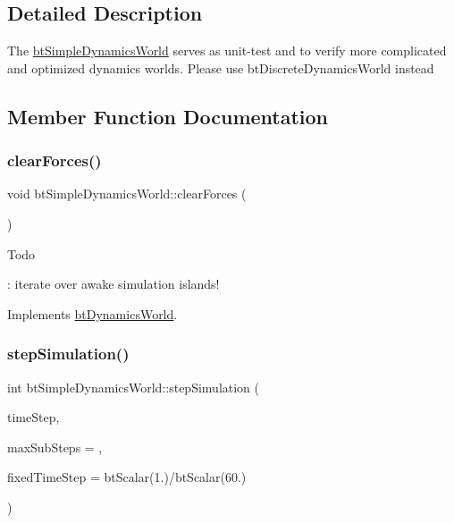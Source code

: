 \subsection{Detailed Description}
The \hyperlink{classbtSimpleDynamicsWorld}{bt\+Simple\+Dynamics\+World} serves as unit-\/test and to verify more complicated and optimized dynamics worlds. Please use bt\+Discrete\+Dynamics\+World instead 

\subsection{Member Function Documentation}
\mbox{\label{classbtSimpleDynamicsWorld_ac44c80444f4d6d4e3c2955dd43b7a93a}} 
\subsubsection{\texorpdfstring{clear\+Forces()}{clearForces()}}
{\footnotesize\ttfamily void bt\+Simple\+Dynamics\+World\+::clear\+Forces (\begin{DoxyParamCaption}{ }\end{DoxyParamCaption})\hspace{0.3cm}{\ttfamily [virtual]}}

\begin{DoxyRefDesc}{Todo}
\item[\hyperlink{todo__todo000033}{Todo}]\+: iterate over awake simulation islands! \end{DoxyRefDesc}


Implements \hyperlink{classbtDynamicsWorld}{bt\+Dynamics\+World}.

\mbox{\label{classbtSimpleDynamicsWorld_af6b4810b5018cbaf09f82839111a243d}} 
\subsubsection{\texorpdfstring{step\+Simulation()}{stepSimulation()}}
{\footnotesize\ttfamily int bt\+Simple\+Dynamics\+World\+::step\+Simulation (\begin{DoxyParamCaption}\item[{bt\+Scalar}]{time\+Step,  }\item[{int}]{max\+Sub\+Steps = {},  }\item[{bt\+Scalar}]{fixed\+Time\+Step = {\ttfamily btScalar(1.)/btScalar(60.)} }\end{DoxyParamCaption})\hspace{0.3cm}{\ttfamily [virtual]}}



